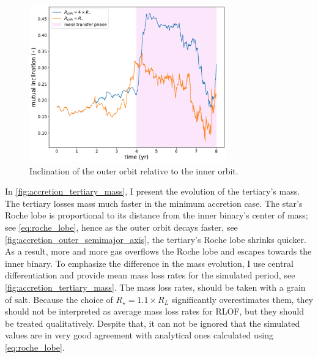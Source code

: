 \begin{figure}[!htb]
    \centering
    \includegraphics[width=0.76\textwidth]{Thesis/graphs/accretion_case/accretion_inc.pdf}
    \caption{Inclination of the outer orbit relative to the inner orbit.}
    \label{fig:accretion_inc}
\end{figure}
In \cref{fig:accretion_tertiary_mass}, I present the evolution of the tertiary's mass. The tertiary losses mass much faster in the minimum accretion case. The star's Roche lobe is proportional to its distance from the inner binary's center of mass; see \cref{eq:roche_lobe}, hence as the outer orbit decays faster, see \cref{fig:accretion_outer_semimajor_axis}, the tertiary's Roche lobe shrinks quicker. As a result, more and more gas overflows the Roche lobe and escapes towards the inner binary. To emphasize the difference in the mass evolution, I use central differentiation and provide mean mass loss rates for the simulated period, see \cref{fig:accretion_tertiary_mass}. The mass loss rates, should be taken with a grain of salt. Because the choice of $R_{\star} = 1.1 \times R_L$ significantly overestimates them, they should not be interpreted as average mass loss rates for RLOF, but they should be treated qualitatively. Despite that, it can not be ignored that the simulated values are in very good agreement with analytical ones calculated using \cref{eq:roche_lobe}.
